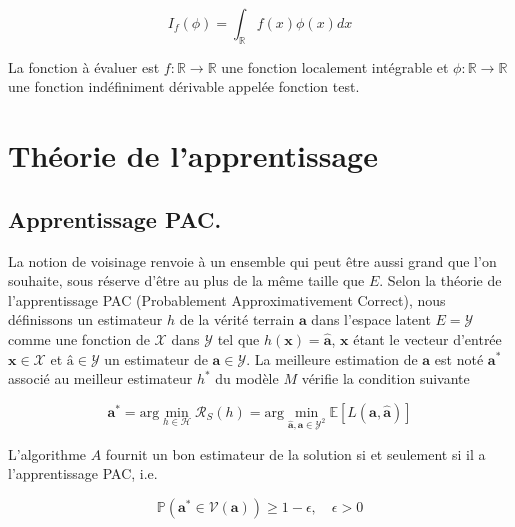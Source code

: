 \begin{equation}
    I_{f}(\phi) = \int_{\mathbb{R}} f(x)\phi(x)dx 
\end{equation}

\newpage

\noindent La fonction à évaluer est $f : \mathbb{R} \rightarrow \mathbb{R}$ une fonction localement intégrable et $\phi : \mathbb{R} \rightarrow \mathbb{R}$ une fonction indéfiniment dérivable appelée fonction test. \newline

\section{Théorie de l'apprentissage}

\subsection{Apprentissage PAC.} 

\noindent La notion de voisinage renvoie à un ensemble qui peut être aussi grand que l'on souhaite, sous réserve d'être au plus de la même taille que $E$. Selon la théorie de l'apprentissage PAC (Probablement Approximativement Correct), 
nous définissons un estimateur $h$ de la vérité terrain $\boldsymbol{a}$ dans l'espace latent $E = \mathcal{Y}$ comme une fonction de $\mathcal{X}$ dans $\mathcal{Y}$ tel que $h(\boldsymbol{x}) = \hat{\boldsymbol{a}}$, $\boldsymbol{x}$ étant le vecteur d'entrée $\boldsymbol{x} \in \mathcal{X}$ 
et $\boldsymbol{â} \in \mathcal{Y}$ un estimateur de $\boldsymbol{a} \in \mathcal{Y}$. La meilleure estimation de $\boldsymbol{a}$ est noté $\boldsymbol{a}^{*}$ associé au meilleur estimateur $h^{*}$ du modèle $M$ vérifie la condition suivante 

\begin{equation}
    \boldsymbol{a}^{*} = \text{arg} \min_{h \in \mathcal{H}} \mathcal{R}_S (h) = \text{arg} \min_{\hat{\boldsymbol{a}}, \boldsymbol{a} \in \mathcal{Y}^2} \mathbb{E} \left[ L(\boldsymbol{a}, \hat{\boldsymbol{a}}) \right] \nonumber
\end{equation}

L'algorithme $A$ fournit un bon estimateur de la solution si et seulement si il a l'apprentissage PAC, i.e.

\begin{equation}
    \mathbb{P} \left( \boldsymbol{a}^{*} \in \mathcal{V}(\boldsymbol{a}) \right) \ge 1 - \epsilon, \quad \epsilon > 0
\end{equation}

